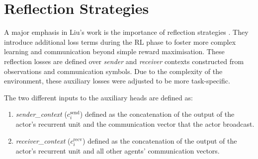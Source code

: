 


\section{Reflection Strategies}
\label{sec:3.7}

A major emphasis in Liu's work is the importance of reflection strategies \cite{AIMotherTongue}.
They introduce additional loss terms during the RL phase to foster more complex learning and communication beyond simple reward maximisation.
These reflection losses are defined over \emph{sender} and \emph{receiver} contexts constructed from observations and communication symbols.
Due to the complexity of the environment, these auxiliary losses were adjusted to be more task-specific.


The two different inputs to the auxiliary heads are defined as:
\begin{enumerate}
    \item \textit{sender\_context} ($c^{\text{send}}_{i}$) defined as the concatenation of the output of the actor's recurrent unit and the communication vector that the actor broadcast.
    \item \textit{receiver\_context} ($c^{\text{recv}}_{i}$) defined as the concatenation of the output of the actor's recurrent unit and all other agents' communication vectors.
\end{enumerate}

